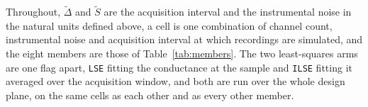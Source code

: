 Throughout, $\widetilde{\Delta}$ and $\widetilde{S}$ are the acquisition interval and the instrumental noise in the natural units defined above, a cell is one combination of channel count, instrumental noise and acquisition interval at which recordings are simulated, and the eight members are those of Table~\ref{tab:members}.
The two least-squares arms are one flag apart, \texttt{LSE} fitting the conductance at the sample and \texttt{ILSE} fitting it averaged over the acquisition window, and both are run over the whole design plane, on the same cells as each other and as every other member. %
